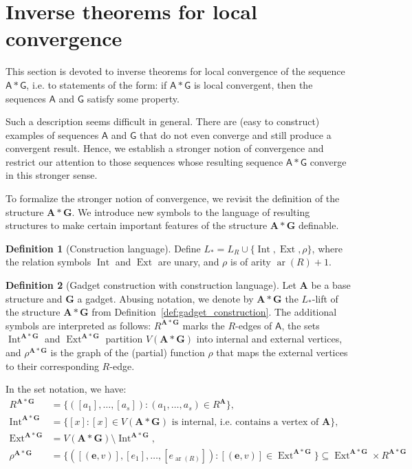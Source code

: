 \documentclass[11pt]{article}
\theoremstyle{plain}
\theoremstyle{definition}
\newtheorem{definition}{Definition}
\theoremstyle{remark}
\DeclareMathOperator\aritysym{ar}
\newcommand{\arity}[1]{{\aritysym({#1})}}
\newcommand{\str}[1]{\mathbf{#1}}
\newcommand{\strseq}[1]{{\boldsymbol{\mathsf{#1}}}}
\newcommand{\tpl}[1]{{\bm{#1}}}
\DeclareMathOperator\Int{Int}
\DeclareMathOperator\Ext{Ext}
\begin{document}
 \section{Inverse theorems for local convergence}\label{sec:inverse_theorems}

This section is devoted to inverse theorems for local convergence of the sequence $\strseq{A}*\strseq{G}$, i.e. to statements of the form:
if $\strseq{A}*\strseq{G}$ is local convergent, then the sequences $\strseq{A}$ and $\strseq{G}$ satisfy some property.

Such a description seems difficult in general.
There are (easy to construct) examples of sequences $\strseq{A}$ and $\strseq{G}$ that do not even converge and still produce a convergent result.
Hence, we establish a stronger notion of convergence and restrict our attention to those sequences whose resulting sequence $\strseq{A}*\strseq{G}$ converge in this stronger sense.

To formalize the stronger notion of convergence, we revisit the definition of the structure $\str{A}*\str{G}$.
We introduce new symbols to the language of resulting structures to make certain important features of the structure $\str{A}*\str{G}$ definable.

\begin{definition}[Construction language]\label{def:construction_language}
    Define $L_* = L_R \cup \{\Int, \Ext, \rho\}$, where the relation symbols $\Int$ and $\Ext$ are unary, and $\rho$ is of arity $\arity{R}+1$.
\end{definition}

\begin{definition}[Gadget construction with construction language]\label{def:gadget_construction_with_construction_language}
    Let $\str{A}$ be a base structure and $\str{G}$ a gadget.
    Abusing notation, we denote by $\str{A}*\str{G}$ the $L_*$-lift of the structure $\str{A}*\str{G}$ from Definition~\ref{def:gadget_construction}.
    The additional symbols are interpreted as follows:
    $R^{\str{A} * \str{G}}$ marks the $R$-edges of $\strseq{A}$, the sets $\Int^{\str{A}*\str{G}}$ and $\Ext^{\str{A}*\str{G}}$ partition $V(\str{A}*\str{G})$ into internal and external vertices, and $\rho^{\str{A}*\str{G}}$ is the graph of the (partial) function $\rho$ that maps the external vertices to their corresponding $R$-edge. 
    
    In the set notation, we have:
    \begin{align*}
        R^{\str{A}*\str{G}}    &= \{([a_1], \dots, [a_s]) : (a_1, \dots, a_s) \in R^\str{A} \}
        ,\\
        \Int^{\str{A}*\str{G}} &= \{[x] : [x] \in V(\str{A} * \str{G}) \text{ is internal, i.e. contains a vertex of }\str{A} \}
        ,\\
        \Ext^{\str{A}*\str{G}} &= V(\str{A} * \str{G}) \setminus \Int^{\str{A}*\str{G}}
        ,\\
        \rho^{\str{A}*\str{G}} &= \{([(\tpl{e}, v)], [e_1], \dots, [e_\arity{R}]) : [(\tpl{e}, v)] \in \Ext^{\str{A}*\str{G}}\} \subseteq \Ext^{\str{A}*\str{G}} \times R^{\str{A}*\str{G}}
    \end{align*}
\end{definition}
\end{document}
